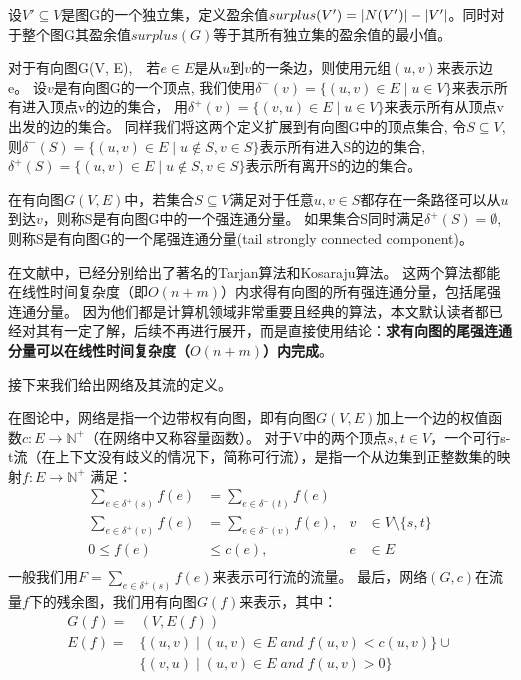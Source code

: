 设$V' \subseteq V$是图G的一个独立集，定义盈余值$surplus(V') = \left\vert N(V') \right\vert - \left\vert V' \right\vert$。同时对于整个图G其盈余值$surplus(G)$等于其所有独立集的盈余值的最小值。

对于有向图G(V, E),　若$e \in E$是从$u$到$v$的一条边，则使用元组$(u, v)$来表示边e。
设$v$是有向图G的一个顶点, 我们使用$\delta^-(v)=\{(u, v) \in E\;|\;u \in V\}$来表示所有进入顶点v的边的集合，
用$\delta^+(v)=\{(v, u) \in E\;|\;u \in V\}$来表示所有从顶点v出发的边的集合。
同样我们将这两个定义扩展到有向图G中的顶点集合, 令$S \subseteq V$,
则$\delta^-(S)=\{(u, v) \in E\;|\;u \notin S, v \in S\}$表示所有进入S的边的集合,
$\delta^+(S)=\{(u, v) \in E\;|\; u \notin S, v \in S\}$表示所有离开S的边的集合。

\begin{definition}
在有向图$G(V, E)$中，若集合$S \subseteq V$满足对于任意$u, v \in S$都存在一条路径可以从$u$到达$v$，则称S是有向图G中的一个强连通分量。
如果集合S同时满足$\delta^+(S) = \emptyset$, 则称S是有向图G的一个尾强连通分量(tail strongly connected component)。
\end{definition}

在文献\cite{tarjan1972depth,sharir1981strong}中，已经分别给出了著名的Tarjan算法和Kosaraju算法。
这两个算法都能在线性时间复杂度（即$O(n + m)$）内求得有向图的所有强连通分量，包括尾强连通分量。
因为他们都是计算机领域非常重要且经典的算法，本文默认读者都已经对其有一定了解，后续不再进行展开，而是直接使用结论：\textbf{求有向图的尾强连通分量可以在线性时间复杂度（$O(n + m)$）内完成}。

接下来我们给出网络及其流的定义。

在图论中，网络是指一个边带权有向图，即有向图$G(V, E)$加上一个边的权值函数$c: E \rightarrow \mathbb{N}^+$（在网络中又称容量函数）。
对于V中的两个顶点$s, t \in V$，一个可行s-t流（在上下文没有歧义的情况下，简称可行流），是指一个从边集到正整数集的映射$f: E \rightarrow \mathbb{N}^+$ 满足：
\begin{equation} \label{EquationFlow} \begin{aligned}
  \sum_{e\in \delta^+(s)}{f(e)}&=\sum_{e\in \delta^-(t)}{f(e)}& \\
  \sum_{e\in \delta^+(v)}{f(e)}&=\sum_{e\in \delta^-(v)}{f(e)}, & v &\in V \setminus \{s, t\} \\
  0 \le f(e) &\le c(e), & e &\in E \\
\end{aligned} \end{equation}
一般我们用$F=\sum_{e\in \delta^+(s)}{f(e)}$来表示可行流的流量。
最后，网络$(G, c)$在流量$f$下的残余图，我们用有向图$G(f)$来表示，其中：
\begin{equation*} \begin{aligned}
  G(f) = &(V, E(f)) \\
  E(f) = &\{(u,v)\;|\;(u, v) \in E\;and\;f(u, v) < c(u, v)\} \cup \\
  &\{(v,u)\;|\;(u, v) \in E\;and\;f(u, v) > 0\}
\end{aligned} \end{equation*}

